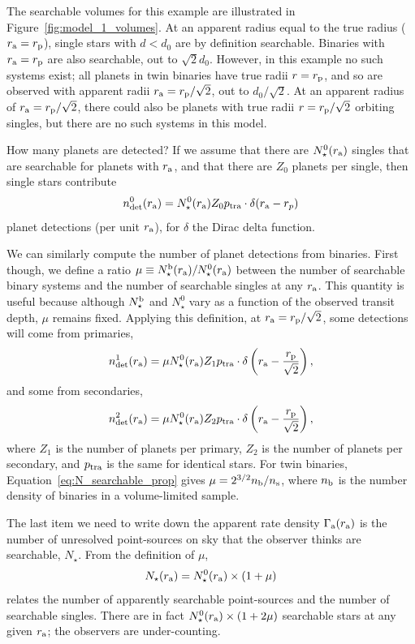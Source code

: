 \documentclass[12pt,modern]{aastex61}
\renewcommand{\a}{_{\rm a}}
\newcommand{\p}{_{\rm p}}
\begin{document}
The searchable volumes for this example are illustrated in
Figure~\ref{fig:model_1_volumes}.  At an apparent radius equal to the
true radius ($r\a=r\p$), single stars with $d<d_0$ are by definition
searchable.  Binaries with $r\a=r\p$ are also searchable, out to
$\sqrt{2}d_0$.  However, in this example no such systems exist; all
planets in twin binaries have true radii $r=r\p$, and so are observed
with apparent radii $r\a=r\p/\sqrt{2}$, out to $d_0/\sqrt{2}$.  At an
apparent radius of $r\a=r\p/\sqrt{2}$, there could also be planets
with true radii $r=r\p/\sqrt{2}$ orbiting singles, but there are no
such systems in this model.

How many planets are detected?  If we assume that there are
$N_\star^0(r\a)$ singles that are searchable for planets with $r\a$,
and that there are $Z_0$ planets per single, then single stars
contribute
\begin{equation}
n_{\rm det}^0(r\a) = 
  N_\star^0(r\a) Z_0 p_{\rm tra} \cdot \delta(r\a - r_p)
\end{equation}
planet detections (per unit $r\a$), for $\delta$ the Dirac delta
function.

We can similarly compute the number of planet detections from
binaries.  First though, we define a ratio $\mu \equiv N_\star^{\rm
b}(r\a) / N_\star^0(r\a)$ between the number of searchable binary
systems and the number of searchable singles at any $r\a$.  This
quantity is useful because although $N_\star^{\rm b}$ and $N_\star^0$
vary as a function of the observed transit depth, $\mu$ remains fixed.
Applying this definition, at $r\a=r\p/\sqrt{2}$, some detections will
come from primaries,
\begin{equation}
n_{\rm det}^1(r\a) =
    \mu N_\star^0(r\a) Z_1 p_{\rm tra}
    \cdot \delta\left(r\a - \frac{r\p}{\sqrt{2}}\right),
\end{equation}
and some from secondaries,
\begin{equation}
n_{\rm det}^2(r\a) = 
    \mu N_\star^0(r\a) Z_2 p_{\rm tra}
    \cdot \delta\left(r\a - \frac{r\p}{\sqrt{2}}\right),
\end{equation}
where $Z_1$ is the number of planets per primary, $Z_2$ is the number
of planets per secondary, and $p_{\rm tra}$ is the same for identical
stars.  For twin binaries, Equation~\ref{eq:N_searchable_prop} gives
$\mu = 2^{3/2} n_{\rm b}/n_{\rm s}$, where $n_{\rm b}$ is the number
density of binaries in a volume-limited sample.

The last item we need to write down the apparent rate density
$\Gamma\a(r\a)$ is the number of unresolved point-sources on sky that
the observer thinks are searchable, $N_\star$.  From the definition of
$\mu$,
\begin{equation}
    N_\star(r\a) = N_\star^0(r\a) \times (1 + \mu)
    \label{eq:apparentlysearchable_to_searchable}
\end{equation}
relates the number of apparently searchable point-sources and the
number of searchable singles.  There are in fact $N_\star^0(r\a)\times
(1 + 2\mu)$ searchable stars at any given $r\a$; the observers are
under-counting.
\end{document}
